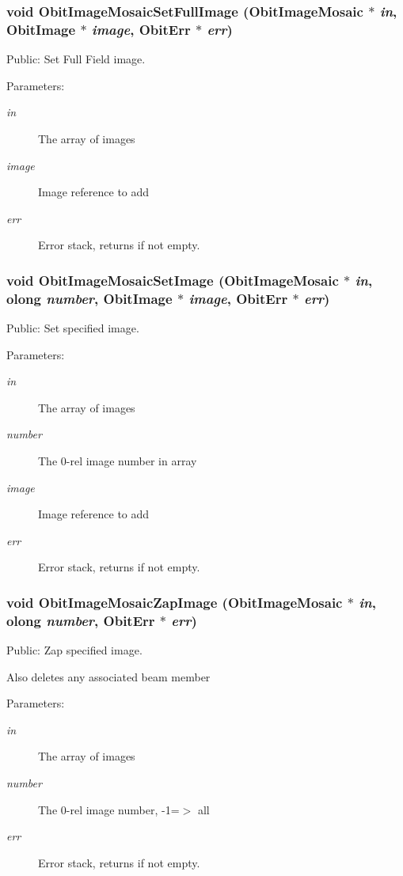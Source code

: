 \subsubsection{\setlength{\rightskip}{0pt plus 5cm}void Obit\-Image\-Mosaic\-Set\-Full\-Image ({\bf Obit\-Image\-Mosaic} $\ast$ {\em in}, {\bf Obit\-Image} $\ast$ {\em image}, {\bf Obit\-Err} $\ast$ {\em err})}\label{ObitImageMosaic_8c_a19}


Public: Set Full Field image. 

\begin{Desc}
\item[Parameters:]
\begin{description}
\item[{\em in}]The array of images \item[{\em image}]Image reference to add \item[{\em err}]Error stack, returns if not empty. \end{description}
\end{Desc}
\subsubsection{\setlength{\rightskip}{0pt plus 5cm}void Obit\-Image\-Mosaic\-Set\-Image ({\bf Obit\-Image\-Mosaic} $\ast$ {\em in}, {\bf olong} {\em number}, {\bf Obit\-Image} $\ast$ {\em image}, {\bf Obit\-Err} $\ast$ {\em err})}\label{ObitImageMosaic_8c_a16}


Public: Set specified image. 

\begin{Desc}
\item[Parameters:]
\begin{description}
\item[{\em in}]The array of images \item[{\em number}]The 0-rel image number in array \item[{\em image}]Image reference to add \item[{\em err}]Error stack, returns if not empty. \end{description}
\end{Desc}
\subsubsection{\setlength{\rightskip}{0pt plus 5cm}void Obit\-Image\-Mosaic\-Zap\-Image ({\bf Obit\-Image\-Mosaic} $\ast$ {\em in}, {\bf olong} {\em number}, {\bf Obit\-Err} $\ast$ {\em err})}\label{ObitImageMosaic_8c_a14}


Public: Zap specified image. 

Also deletes any associated beam member \begin{Desc}
\item[Parameters:]
\begin{description}
\item[{\em in}]The array of images \item[{\em number}]The 0-rel image number, -1=$>$ all \item[{\em err}]Error stack, returns if not empty. \end{description}
\end{Desc}
